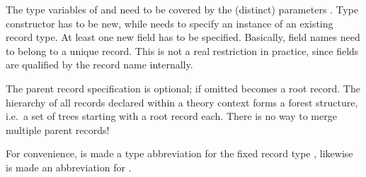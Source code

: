 \begin{isabellebody}
\begin{isamarkuptext}
\begin{descr}
  The type variables of \isa{{\isachardoublequote}{\isasymtau}{\isachardoublequote}} and  need to be
  covered by the (distinct) parameters .  Type constructor  has to be new, while \isa{{\isasymtau}} needs to specify an instance of an existing record type.  At
  least one new field  has to be specified.
  Basically, field names need to belong to a unique record.  This is
  not a real restriction in practice, since fields are qualified by
  the record name internally.

  The parent record specification \isa{{\isasymtau}} is optional; if omitted
   becomes a root record.  The hierarchy of all records
  declared within a theory context forms a forest structure, i.e.\ a
  set of trees starting with a root record each.  There is no way to
  merge multiple parent records!

  For convenience,  is made a
  type abbreviation for the fixed record type , likewise is  made an abbreviation for
  .


\end{descr}
\end{isamarkuptext}
\end{isabellebody}
